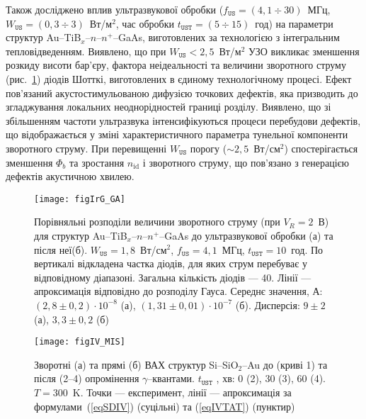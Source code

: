 Також досліджено вплив ультразвукової обробки
($f_\mathtt{US}=(4,1\div30)$~МГц, $W_\mathtt{US}=(0,3\div3)$~Вт/м$^2$, час обробки $t_\mathtt{UST}=(5\div15)$~год) на параметри структур
Au--TiB$_x$--$n$--$n^+$--GaAs, виготовлених
за технологією з інтегральним тепловідведенням.
Виявлено, що при $W_\mathtt{US}<2,5$~Вт/м$^2$ УЗО викликає зменшення розкиду висоти бар'єру, фактора неідеальності та величини зворотного струму (рис.~\ref{figIrG_GA})
діодів Шотткі, виготовлених в єдиному технологічному процесі.
Ефект пов'язаний акустостимульованою дифузією точкових дефектів, яка призводить до згладжування локальних неоднорідностей границі розділу.
Виявлено, що зі збільшенням частоти ультразвука інтенсифікуються процеси перебудови дефектів, що відображається у зміні характеристичного  параметра тунельної компоненти зворотного
струму.
При перевищенні $W_\mathtt{US}$ порогу ($\sim2,5$~Вт/см$^2$) спостерігається зменшення $\Phi_b$ та зростання $n_\mathrm{id}$ і зворотного струму, що пов'язано з генерацією дефектів акустичною хвилею.

\begin{figure}
\center
\texttt{[image: figIrG\_GA]}%
\caption{\label{figIrG_GA}
Порівняльні розподіли величини зворотного струму (при $V_R=2$~В)
для структур Au--TiB$_x$--$n$--$n^+$--GaAs до ультразвукової обробки (а) та після неї(б).
$W_\mathtt{US}=1,8$~Вт/см$^2$, $f_\mathtt{US}=4,1$~МГц, $t_\mathtt{UST}=10$~год.
По вертикалі відкладена частка діодів, для яких струм перебуває у відповідному діапазоні.
Загальна кількість діодів --- 40.
Лінії --- апроксимація відповідно до розподілу Гауса.
Середнє значення, А:
$(2,8\pm0,2)\cdot10^{-8}$ (а),
$(1,31\pm0,01)\cdot10^{-7}$ (б).
Дисперсія:
$9\pm2$ (а),
$3,3\pm0,2$ (б)
\vspace{1em}
}
\end{figure}

\begin{figure}[t]
\center
\texttt{[image: figIV\_MIS]}%
\caption{\label{figIV_MIS}
Зворотні (а) та прямі (б) ВАХ структур Si--SiO$_2$--Au до (криві 1)
та після (2--4) опромінення $\gamma$--квантами.
$t_\mathtt{UST}$ , хв: 0 (2), 30 (3), 60 (4).
$T=300$~K.
Точки --- експеримент,
лінії --- апроксимація за формулами~(\ref{eqSDIV}) (суцільні) та (\ref{eqIVTAT}) (пунктир)
\vspace{1em}
}%
\end{figure}

